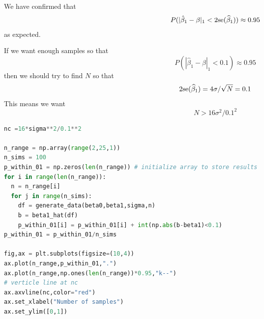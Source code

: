 \begin{example}
We have confirmed that 
\begin{equation}
P(|\hat{\beta}_1 - \beta|_1<2{\rm se}(\widehat{\beta}_1)) \approx 0.95 
\end{equation}
as expected. 

If we want enough samples so that 
\begin{equation}
P(|\hat{\beta}_1 - \beta|_1<0.1) \approx 0.95
\end{equation}
then we should try to find $N$ so that 
\begin{equation}
2{\rm se}(\widehat{\beta}_1) = 4 \sigma/\sqrt{N} = 0.1
\end{equation}
This means we want 
\begin{equation}
N > 16\sigma^2/0.1^2
\end{equation}

\begin{lstlisting}[language=Python]
nc =16*sigma**2/0.1**2

n_range = np.array(range(2,25,1)) 
n_sims = 100 
p_within_01 = np.zeros(len(n_range)) # initialize array to store results
for i in range(len(n_range)):
  n = n_range[i]
  for j in range(n_sims):
    df = generate_data(beta0,beta1,sigma,n)
    b = beta1_hat(df)
    p_within_01[i] = p_within_01[i] + int(np.abs(b-beta1)<0.1)
p_within_01 = p_within_01/n_sims

fig,ax = plt.subplots(figsize=(10,4))
ax.plot(n_range,p_within_01,".")
ax.plot(n_range,np.ones(len(n_range))*0.95,"k--")
# verticle line at nc
ax.axvline(nc,color="red")
ax.set_xlabel("Number of samples")
ax.set_ylim([0,1])
\end{lstlisting}

 \end{example}

